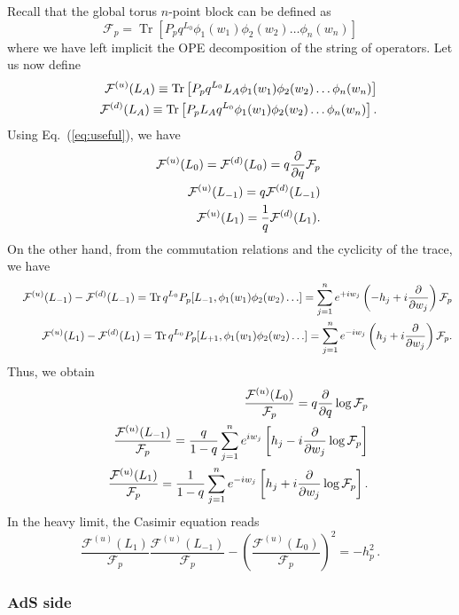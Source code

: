 \documentclass[12pt]{article}
\newcommand{\bea}{\begin{eqnarray}}
\newcommand{\eea}{\end{eqnarray}}
\DeclareMathOperator{\Tr}{Tr}
\begin{document}
Recall that the global torus $n$-point block can be defined as
\begin{equation}
\mathcal{F}_p=\Tr\left[ P_{p}q^{L_0}\phi_1(w_1)\phi_2(w_2) \ldots \phi_n(w_n) \right]
\end{equation}
where we have left implicit the OPE decomposition of the string of operators.
Let us now define
\bea
&~& \mathcal{F}^{(u)}(L_A) \equiv
\Tr\left[ P_{p}  q^{L_0}L_A\phi_1(w_1)\phi_2(w_2) \ldots \phi_n(w_n) \right]
\notag \\
&~& \mathcal{F}^{(d)}(L_A)
\equiv
\Tr\left[ P_{p}  L_Aq^{L_0} \phi_1(w_1)\phi_2(w_2) \ldots \phi_n(w_n) \right]
 . \eea
Using Eq.~(\ref{eq:useful}), we have
\bea &~&\mathcal{F}^{(u)}(L_0)=\mathcal{F}^{(d)}(L_0)=q\frac{\partial}{\partial q}\mathcal{F}_p \notag \\
&~&\mathcal{F}^{(u)}(L_{-1})=q\mathcal{F}^{(d)}(L_{-1}) \notag \\
&~&\mathcal{F}^{(u)}(L_1)=\frac{1}{q}\mathcal{F}^{(d)}(L_1).
\eea
On the other hand, from the commutation relations and the cyclicity of the trace, we have
\bea &~&\mathcal{F}^{(u)}(L_{-1})-\mathcal{F}^{(d)}(L_{-1})
=\Tr q^{L_0}P_{p}[L_{-1},\phi_1(w_1)\phi_2(w_2)\ldots]=
\sum_{j=1}^n
e^{+iw_j}\left(-h_j+i\frac{\partial}{\partial w_j}\right)
\mathcal{F}_p \notag \\
&~&\mathcal{F}^{(u)}(L_1)-\mathcal{F}^{(d)}(L_1)
=\Tr q^{L_0}P_{p}[L_{+1},\phi_1(w_1)\phi_2(w_2)\ldots]
=\sum_{j=1}^n e^{-iw_j}\left(h_j+i\frac{\partial}{\partial w_j}\right)
\mathcal{F}_p. \notag \\
\eea
Thus, we obtain
\bea &~& \frac{\mathcal{F}^{(u)}(L_0)}{\mathcal{F}_p}=q\frac{\partial}{\partial q}\log \mathcal{F}_p \notag \\
&~&\frac{\mathcal{F}^{(u)}(L_{-1})}{\mathcal{F}_p}=
\frac{q}{1-q}\sum_{j=1}^n e^{iw_j}\left[h_j-i\frac{\partial}{\partial w_j}\log\mathcal{F}_p\right] \notag \\
&~&\frac{\mathcal{F}^{(u)}(L_{1})}{\mathcal{F}_p}=
\frac{1}{1-q}\sum_{j=1}^n e^{-iw_j}\left[h_j+i\frac{\partial}{\partial w_j}\log\mathcal{F}_p\right].
\eea
In the heavy limit, the Casimir equation reads
\begin{equation} \frac{\mathcal{F}^{(u)}(L_1)}{\mathcal{F}_p}\frac{\mathcal{F}^{(u)}(L_{-1})}{\mathcal{F}_p}
-\left(\frac{\mathcal{F}^{(u)}(L_0)}{\mathcal{F}_p}\right)^2=-h_p^2 \,. \end{equation}

\subsubsection{AdS side}
\end{document}
